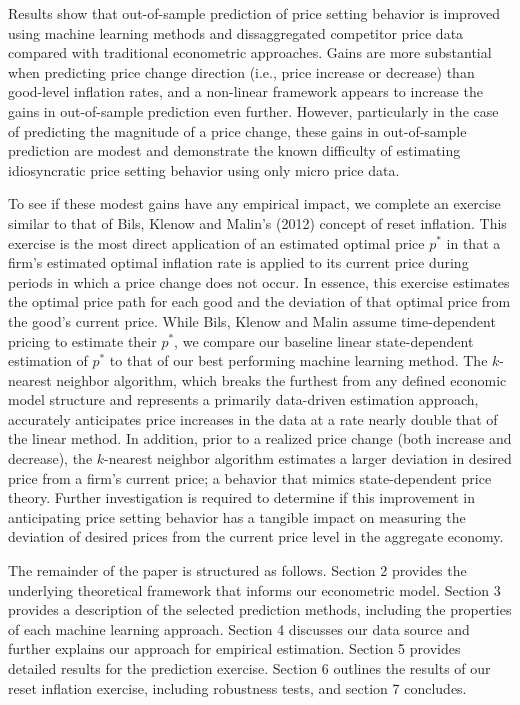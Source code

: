 \documentclass[11pt]{article}
\begin{document}
Results show that out-of-sample prediction of price setting behavior is improved using machine learning methods and dissaggregated competitor price data compared with traditional econometric approaches. Gains are more substantial when predicting price change direction (i.e., price increase or decrease) than good-level inflation rates, and a non-linear framework appears to increase the gains in out-of-sample prediction even further. However, particularly in the case of predicting the magnitude of a price change, these gains in out-of-sample prediction are modest and demonstrate the known difficulty of estimating idiosyncratic price setting behavior using only micro price data.

To see if these modest gains have any empirical impact, we complete an exercise similar to that of Bils, Klenow and Malin's (2012) concept of reset inflation. This exercise is the most direct application of an estimated optimal price $p^*$ in that a firm's estimated optimal inflation rate is applied to its current price during periods in which a price change does not occur. In essence, this exercise estimates the optimal price path for each good and the deviation of that optimal price from the good's current price. While Bils, Klenow and Malin assume time-dependent pricing to estimate their $p^*$, we compare our baseline linear state-dependent estimation of $p^*$ to that of our best performing machine learning method. The $k$-nearest neighbor algorithm, which breaks the furthest from any defined economic model structure and represents a primarily data-driven estimation approach, accurately anticipates price increases in the data at a rate nearly double that of the linear method. In addition, prior to a realized price change (both increase and decrease), the $k$-nearest neighbor algorithm estimates a larger deviation in desired price from a firm's current price; a behavior that mimics state-dependent price theory. Further investigation is required to determine if this improvement in anticipating price setting behavior has a tangible impact on measuring the deviation of desired prices from the current price level in the aggregate economy.  

The remainder of the paper is structured as follows. Section 2 provides the underlying theoretical framework that informs our econometric model. Section 3 provides a description of the selected prediction methods, including the properties of each machine learning approach. Section 4 discusses our data source and further explains our approach for empirical estimation. Section 5 provides detailed results for the prediction exercise. Section 6 outlines the results of our reset inflation exercise, including robustness tests, and section 7 concludes.  
\end{document}
